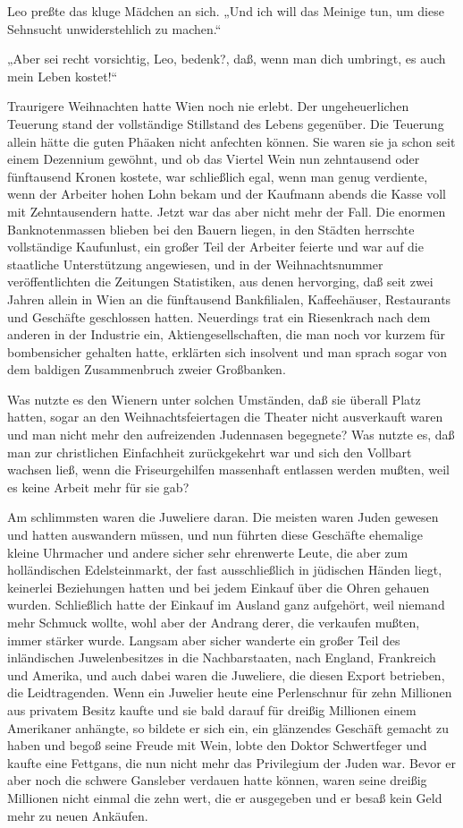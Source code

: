 Leo preßte das kluge Mädchen an sich. „Und ich will das Meinige
tun, um diese Sehnsucht unwiderstehlich zu machen.“

„Aber sei recht vorsichtig, Leo, bedenk?, daß, wenn man dich
umbringt, es auch mein Leben kostet!“

\tb{* * *}
Traurigere Weihnachten hatte Wien noch nie erlebt. Der
ungeheuerlichen Teuerung stand der vollständige Stillstand des
Lebens gegenüber. Die Teuerung allein hätte die guten Phäaken nicht
anfechten können. Sie waren sie ja schon seit einem Dezennium
gewöhnt, und ob das Viertel Wein nun zehntausend oder fünftausend
Kronen kostete, war schließlich egal, wenn man genug verdiente,
wenn der Arbeiter hohen Lohn bekam und der Kaufmann abends die
Kasse voll mit Zehntausendern hatte. Jetzt war das aber nicht mehr
der Fall. Die enormen Banknotenmassen blieben bei den Bauern
liegen, in den Städten herrschte vollständige Kaufunlust, ein
großer Teil der Arbeiter feierte und war auf die staatliche
Unterstützung angewiesen, und in der Weihnachtsnummer
veröffentlichten die Zeitungen Statistiken, aus denen hervorging,
daß seit zwei Jahren allein in Wien an die fünftausend
Bankfilialen, Kaffeehäuser, Restaurants und Geschäfte geschlossen
hatten. Neuerdings trat ein Riesenkrach nach dem anderen in der
 Industrie ein, Aktiengesellschaften, die man noch
vor kurzem für bombensicher gehalten hatte, erklärten sich
insolvent und man sprach sogar von dem baldigen Zusammenbruch
zweier Großbanken.

Was nutzte es den Wienern unter solchen Umständen, daß sie überall
Platz hatten, sogar an den Weihnachtsfeiertagen die Theater nicht
ausverkauft waren und man nicht mehr den aufreizenden Judennasen
begegnete? Was nutzte es, daß man zur christlichen Einfachheit
zurückgekehrt war und sich den Vollbart wachsen ließ, wenn die
Friseurgehilfen massenhaft entlassen werden mußten, weil es keine
Arbeit mehr für sie gab?

Am schlimmsten waren die Juweliere daran. Die meisten waren Juden
gewesen und hatten auswandern müssen, und nun führten diese
Geschäfte ehemalige kleine Uhrmacher und andere sicher sehr
ehrenwerte Leute, die aber zum holländischen Edelsteinmarkt, der
fast ausschließlich in jüdischen Händen liegt, keinerlei
Beziehungen hatten und bei jedem Einkauf über die Ohren gehauen
wurden. Schließlich hatte der Einkauf im Ausland ganz aufgehört,
weil niemand mehr Schmuck wollte, wohl aber der Andrang derer, die
verkaufen mußten, immer stärker wurde. Langsam aber sicher wanderte
ein großer Teil des inländischen Juwelenbesitzes in die
Nachbarstaaten, nach England, Frankreich und Amerika, und auch
dabei waren die Juweliere, die diesen Export betrieben, die
Leidtragenden. Wenn ein Juwelier heute eine Perlenschnur für zehn
Millionen aus privatem Besitz kaufte und sie bald darauf für
dreißig Millionen einem Amerikaner anhängte, so 
bildete er sich ein, ein glänzendes Geschäft gemacht zu haben und
begoß seine Freude mit Wein, lobte den Doktor Schwertfeger und
kaufte eine Fettgans, die nun nicht mehr das Privilegium der Juden
war. Bevor er aber noch die schwere Gansleber verdauen hatte
können, waren seine dreißig Millionen nicht einmal die zehn wert,
die er ausgegeben und er besaß kein Geld mehr zu neuen Ankäufen.

